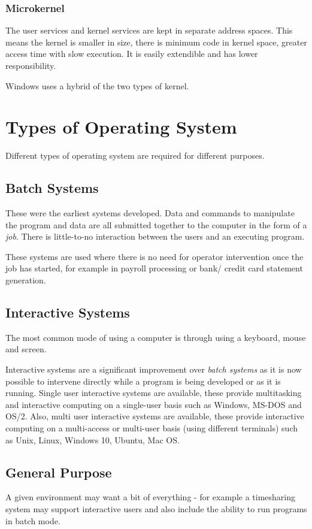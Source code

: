 \subsubsection{Microkernel}
The user services and kernel services are kept in separate address spaces. This means the kernel is smaller in size, there is minimum code in kernel space, greater access time with slow execution. It is easily extendible and has lower responsibility.

Windows uses a hybrid of the two types of kernel.

\section{Types of Operating System}
Different types of operating system are required for different purposes.
\subsection{Batch Systems}
These were the earliest systems developed. Data and commands to manipulate the program and data are all submitted together to the computer in the form of a \textit{job}. There is little-to-no interaction between the users and an executing program.

These systems are used where there is no need for operator intervention once the job has started, for example in payroll processing or bank/ credit card statement generation. 

\subsection{Interactive Systems}
The most common mode of using a computer is through using a keyboard, mouse and screen.

Interactive systems are a significant improvement over \textit{batch systems} as it is now possible to intervene directly while a program is being developed or as it is running. Single user interactive systems are available, these provide multitasking and interactive computing on a single-user basis such as Windows, MS-DOS and OS/2. Also, multi user interactive systems are available, these provide interactive computing on a multi-access or multi-user basis (using different terminals) such as Unix, Linux, Windows 10, Ubuntu, Mac OS. 

\subsection{General Purpose}
A given environment may want a bit of everything - for example a timesharing system may support interactive users and also include the ability to run programs in batch mode.

